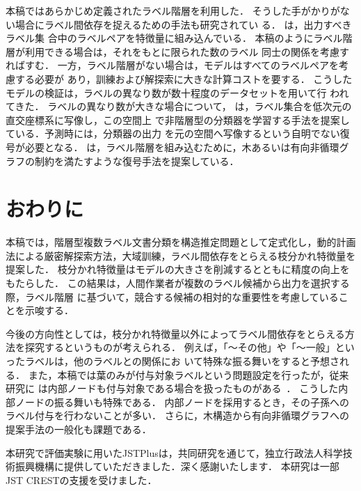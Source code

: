 \documentclass[japanese]{jnlp_1.4}
\begin{document}
本稿ではあらかじめ定義されたラベル階層を利用した．
そうした手がかりがない場合にラベル間依存を捉えるための手法も研究されてい
る．
\cite{Ghamrawi:CIKM2005full,Miyao:COLING2008full}は，出力すべきラベル集
合中のラベルペアを特徴量に組み込んでいる．
本稿のようにラベル階層が利用できる場合は，それをもとに限られた数のラベル
同士の関係を考慮すればすむ．
一方，ラベル階層がない場合は，モデルはすべてのラベルペアを考慮する必要が
あり，訓練および解探索に大きな計算コストを要する．
こうしたモデルの検証は，ラベルの異なり数が数十程度のデータセットを用いて行
われてきた．
ラベルの異なり数が大きな場合について，
\cite{Tai:2012full}は，ラベル集合を低次元の直交座標系に写像し，この空間上
で非階層型の分類器を学習する手法を提案している．予測時には，分類器の出力
を元の空間へ写像するという自明でない復号が必要となる．
\cite{Bi:ICML2011}は，ラベル階層を組み込むために，木あるいは有向非循環グ
ラフの制約を満たすような復号手法を提案している．


\section{おわりに}
\label{sec:conclusion}

本稿では，階層型複数ラベル文書分類を構造推定問題として定式化し，動的計画
法による厳密解探索方法，大域訓練，ラベル間依存をとらえる枝分かれ特徴量を
提案した．
枝分かれ特徴量はモデルの大きさを削減するとともに精度の向上をもたらした．
この結果は，人間作業者が複数のラベル候補から出力を選択する際，ラベル階層
に基づいて，競合する候補の相対的な重要性を考慮していることを示唆する．

今後の方向性としては，枝分かれ特徴量以外によってラベル間依存をとらえる方
法を探究するというものが考えられる．
例えば，「〜その他」や「〜一般」といったラベルは，他のラベルとの関係にお
いて特殊な振る舞いをすると予想される．
また，本稿では葉のみが付与対象ラベルという問題設定を行ったが，従来研究に
は内部ノードも付与対象である場合を扱ったものがある~\cite{Liu2005}．
こうした内部ノードの振る舞いも特殊である．
内部ノードを採用するとき，その子孫へのラベル付与を行わないことが多い．
さらに，木構造から有向非循環グラフへの提案手法の一般化も課題である．



\acknowledgment

本研究で評価実験に用いたJSTPlusは，共同研究を通じて，独立行政法人科学技
術振興機構に提供していただきました．深く感謝いたします．
本研究は一部JST CRESTの支援を受けました．
\end{document}
